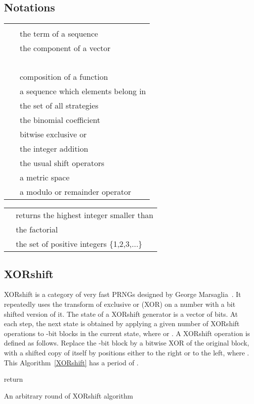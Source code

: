 \documentclass[journal]{IEEEtran}
\begin{document}
\subsection{Notations}
\begin{tabular}{@{}c@{}@{}l@{}}
 &  \\
 &  the  term of a sequence  \\
 &  the  component of a vector \\
&~~~~\\
 &   composition of a function  \\
~ &  a sequence which elements belong in  \\
 &  the set of all strategies \\
 &  the binomial coefficient \\
 &  bitwise exclusive or \\
 &  the integer addition \\
 &  the usual shift operators \\
 &  a metric space \\
 &  a modulo or remainder operator
\end{tabular}

\begin{tabular}{@{}c@{}@{}l@{}}




 &  returns the highest integer smaller than  \\
 &  the factorial \\
 &  the set of positive integers \{1,2,3,...\}
\end{tabular}



\subsection{XORshift}

XORshift is a category of very fast PRNGs designed by George Marsaglia~\cite{Marsaglia2003}.
It repeatedly uses the transform of exclusive or (XOR) on a number with a bit shifted version of it. The state of a XORshift generator is a vector of bits. At each step, the next state is obtained by applying a given number of XORshift operations to -bit blocks in the current state, where  or . A XORshift operation is defined as follows. Replace the -bit block by a bitwise XOR of the original block, with a shifted copy of itself by  positions either to the right or to the left, where . This Algorithm~\ref{XORshift} has a period of .

\begin{algorithm}
\SetAlgoLined
{}
\;
\;
\;
\;
return \;
\medskip
\caption{An arbitrary round of XORshift algorithm}
\label{XORshift}
\end{algorithm}
\end{document}
